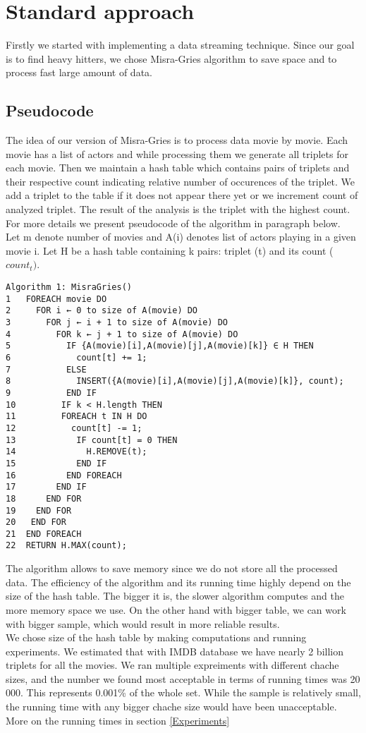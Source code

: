\section{Standard approach}
\label{Standard}

Firstly we started with implementing a data streaming technique. Since our goal is to find heavy hitters, we chose Misra-Gries algorithm to save space and to process fast large amount of data.

\subsection{Pseudocode}
\label{MisraGries}
The idea of our version of Misra-Gries is to process data movie by movie. Each movie has a list of actors and while processing them we generate all triplets for each movie. Then we maintain a hash table which contains pairs of triplets and their respective count indicating relative number of occurences of the triplet. We add a triplet to the table if it does not appear there yet or we increment count of analyzed triplet. The result of the analysis is the triplet with the highest count. For more details we present pseudocode of the algorithm in paragraph below.
\\
Let m denote number of movies and A(i) denotes list of actors playing in a given movie i. 
Let H be a hash table containing k pairs: triplet (t) and its count (\(count_t)\).
\begin{verbatim}
Algorithm 1: MisraGries()
1	FOREACH movie DO
2	  FOR i ← 0 to size of A(movie) DO
3	    FOR j ← i + 1 to size of A(movie) DO
4	      FOR k ← j + 1 to size of A(movie) DO
5	        IF {A(movie)[i],A(movie)[j],A(movie)[k]} ∈ H THEN
6	          count[t] += 1;
7	        ELSE
8	          INSERT({A(movie)[i],A(movie)[j],A(movie)[k]}, count);  
9	        END IF
10	       IF k < H.length THEN
11	       FOREACH t IN H DO
12	         count[t] -= 1;
13	          IF count[t] = 0 THEN
14	            H.REMOVE(t);
15	          END IF
16	        END FOREACH
17	      END IF      
18	    END FOR
19	  END FOR
20	 END FOR
21	END FOREACH
22	RETURN H.MAX(count);	  	                    	  
\end{verbatim}

The algorithm allows to save memory since we do not store all the processed data. The efficiency of the algorithm and its running time highly depend on the size of the hash table. The bigger it is, the slower algorithm computes and the more memory space we use. On the other hand with bigger table, we can work with bigger sample, which would result in more reliable results.
\\
We chose size of the hash table by making computations and running experiments. We estimated that with IMDB database we have nearly 2 billion triplets for all the movies. We ran multiple expreiments with different chache sizes, and the number we found most acceptable in terms of running times was 20 000. This represents 0.001\% of the whole set. While the sample is relatively small, the running time with any bigger chache size would have been unacceptable. More on the running times in section \ref{Experiments}
\\
